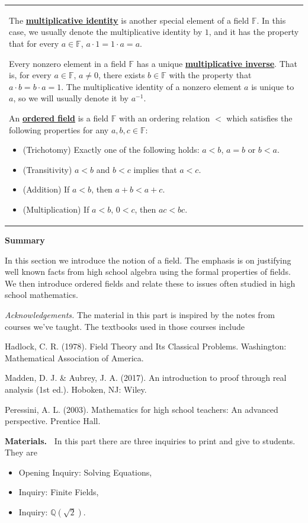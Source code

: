 \documentclass[11pt]{article}
\newcommand\header[1]{\vspace*{4pt}\par {\large {\bf #1}}\par}
\newenvironment{bignote}[1][Instructor note]%
	{\begin{mdframed}\raggedright{\bf #1.~}}
	{\end{mdframed}}
\renewcommand\emph[1]{\underline{\bf{#1}}} %
\theoremstyle{definition}
\begin{document}
\begin{tabular}{L{6.5in}}
  The \emph{multiplicative identity} is another special element of a field $\mathbb{F}$. In this case, we usually denote the multiplicative identity
  by $1$, and it has the property that for every $a\in\mathbb{F}$, $a\cdot 1 = 1 \cdot a = a$.

  Every nonzero element in a field $\mathbb{F}$ has a unique \emph{multiplicative inverse}. That is, for every $a\in\mathbb{F}$, $a\neq 0$, there exists
  $b\in\mathbb{F}$ with the property that $a\cdot b = b \cdot a = 1$. The multiplicative identity of a nonzero element $a$ is unique to $a$, so we will
  usually denote it by $a^{-1}$.

  An \emph{ordered field} is a field $\mathbb{F}$ with an ordering relation $<$ which satisfies the following properties for any $a,b,c\in\mathbb{F}$:
\begin{itemize}
  \item (Trichotomy) Exactly one of the following holds: $a < b$, $a=b$ or $b < a$.
  \item (Transitivity) $a< b$ and $b < c$ implies that $a < c$.
  \item (Addition) If $a< b$, then $a+b < a+c$.
  \item (Multiplication) If $a < b$, $0 < c$, then $ac < bc$.
\end{itemize}

\end{tabular}

\header{Summary}

In this section we introduce the notion of a field. The emphasis is on justifying well known facts from high school algebra using the formal properties of
fields. We then introduce ordered fields and relate these to issues often studied in high school mathematics.

{\it Acknowledgements.}  The material in this part is inspired by the notes from courses we've taught. The textbooks used in those courses include

Hadlock, C. R. (1978). Field Theory and Its Classical Problems. Washington: Mathematical Association of America.

Madden, D. J. \& Aubrey, J. A. (2017). An introduction to proof through real analysis (1st ed.). Hoboken, NJ: Wiley.

Peressini, A. L. (2003). Mathematics for high school teachers: An advanced perspective. Prentice Hall.



\newpage
\begin{bignote}[Materials]
  In this part there are three inquiries to print and give to students. They are
\begin{itemize}
  \item Opening Inquiry: Solving Equations,
  \item Inquiry: Finite Fields,
  \item Inquiry: $\mathbb{Q}(\sqrt{2})$.
\end{itemize}
\end{bignote}
\end{document}
